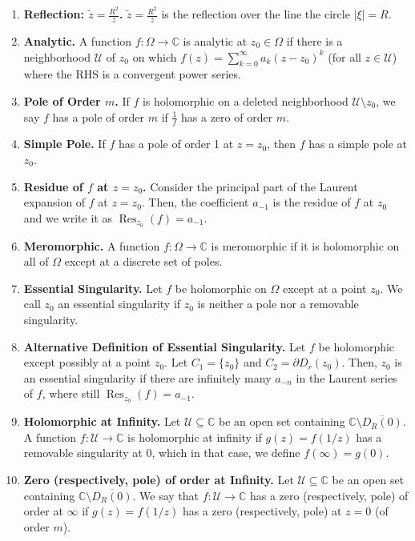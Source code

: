 \documentclass[12pt]{article}
\theoremstyle{definition}
\theoremstyle{named}
\DeclareMathOperator{\Res}{Res}
\begin{document}
{\begin{multicols}{2}
\begin{spacing}{1.01}
\begin{enumerate}
    \item \textbf{Reflection: $\tilde{z} = \frac{R^2}{\overline{z}}$. } $\tilde{z} = \frac{R^2}{\overline{z}}$ is the reflection over the line the circle $|\xi| = R$. 
    \item \textbf{Analytic. } A function $f: \Omega \to \mathbb{C}$ is analytic at $z_0 \in \Omega$ if there is a neighborhood $\mathcal{U}$ of $z_0$ on which $f(z) = \sum_{k=0}^{\infty} a_k(z-z_0)^k$ (for all $z \in \mathcal{U}$) where the RHS is a convergent power series. 
    \item \textbf{Pole of Order $m$. } If $f$ is holomorphic on a deleted neighborhood $\mathcal{U} \setminus {z_0}$, we say $f$ has a pole of order $m$ if $\frac{1}{f}$ has a zero of order $m$. 
    \item \textbf{Simple Pole. } If $f$ has a pole of order 1 at $z=z_0$, then $f$ has a simple pole at $z_0$. 
    \item \textbf{Residue of $f$ at $z=z_0$. } Consider the principal part of the Laurent expansion of $f$ at $z=z_0$. Then, the coefficient $a_{-1}$ is the residue of $f$ at $z_0$ and we write it as $\Res_{z_0}(f) = a_{-1}$. 
    \item \textbf{Meromorphic. } A function $f: \Omega \to \mathbb{C}$ is meromorphic if it is holomorphic on all of $\Omega$ except at a discrete set of poles. 
    \item \textbf{Essential Singularity. } Let $f$ be holomorphic on $\Omega$ except at a point $z_0$. We call $z_0$ an essential singularity if $z_0$ is neither a pole nor a removable singularity. 
    \item \textbf{Alternative Definition of Essential Singularity. } Let $f$ be holomorphic except possibly at a point $z_0$. Let $C_1 = \{z_0\}$ and $C_2 = \partial D_r(z_0)$. Then, $z_0$ is an essential singularity if there are infinitely many $a_{-n}$ in the Laurent series of $f$, where still $\Res_{z_0}(f) = a_{-1}$. 
    \item \textbf{Holomorphic at Infinity. } Let $\mathcal{U} \subseteq \mathbb{C}$ be an open set containing $\mathbb{C} \setminus \overline{D_R(0)}$. A function $f: \mathcal{U} \to \mathbb{C}$ is holomorphic at infinity if $g(z) = f(1/z)$ has a removable singularity at 0, which in that case, we define $f(\infty) = g(0)$. 
    \item \textbf{Zero (respectively, pole) of order at Infinity. } Let $\mathcal{U} \subseteq \mathbb{C}$ be an open set containing $\mathbb{C} \setminus \overline{D_R(0)}$. We say that $f: \mathcal{U} \to \mathbb{C}$ has a zero (respectively, pole) of order at $\infty$ if $g(z) = f(1/z)$ has a zero (respectively, pole) at $z=0$ (of order $m$). 

\end{enumerate}
\end{spacing}
\end{multicols}}
\end{document}
